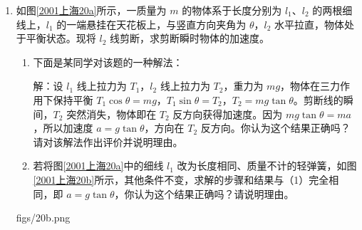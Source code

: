 \documentclass[\gkver]{gaokaozhenti}
\begin{document}
\begin{enumerate}
{凝结成雨滴年降落到地面水的总质量为 $m$

$m=\frac{W\times(1-7\%)\times(1-35\%)}{2.2\times10^{6}}=5.14\times10^{17}\Ukg$ ②

使地球表面覆盖一层水的厚度为 $h$

$h=\frac{m}{\rho S_{\text{地球}}}$

解得 $h=1.01\times10^{3}\Umm$ ③

整个地球表面年平均降雨量约为 $1.0\times10^{3}\Umm$。

（b）大气层的吸收，大气层的散射或反射，云层遮挡等。

评分标准：全题 10 分。第（1）小题 3 分，第（2）小题 7 分。其中（1）得出①给 3 分，写出 $R=6.4\times10^{6}\Um$，同样给分。（2）（a）得出②给 2 分，得出③给 2 分。（b）写出 1 个原因，得 1 分；2 个或 2 个以上正确的原因，得 3 分；如果写出其它合理的原因，也同样给分。
}

\item
如图\ref{2001上海20a}所示，一质量为 $m$ 的物体系于长度分别为 $l_{1}$、$l_{2}$ 的两根细线上，$l_{1}$ 的一端悬挂在天花板上，与竖直方向夹角为 $\theta$，$l_{2}$ 水平拉直，物体处于平衡状态。现将 $l_{2}$ 线剪断，求剪断瞬时物体的加速度。
\begin{enumerate}
	\item
	下面是某同学对该题的一种解法：

	解：设 $l_{1}$ 线上拉力为 $T_{1}$，$l_{2}$ 线上拉力为 $T_{2}$，重力为 $mg$，物体在三力作用下保持平衡 $T_{1}\cos\theta=mg$，$T_{1}\sin\theta=T_{2}$，$T_{2}=mg\tan\theta$。剪断线的瞬间，$T_{2}$ 突然消失，物体即在 $T_{2}$ 反方向获得加速度。因为 $mg\tan\theta=ma$，所以加速度 $a=g\tan\theta$，方向在 $T_{2}$ 反方向。你认为这个结果正确吗？请对该解法作出评价并说明理由。
	\item
	若将图\ref{2001上海20a}中的细线 $l_{1}$ 改为长度相同、质量不计的轻弹簧，如图\ref{2001上海20b}所示，其他条件不变，求解的步骤和结果与（1）完全相同，即 $a=g\tan\theta$，你认为这个结果正确吗？请说明理由。
\end{enumerate}

{figs/20b.png}

\end{enumerate}
\end{document}
